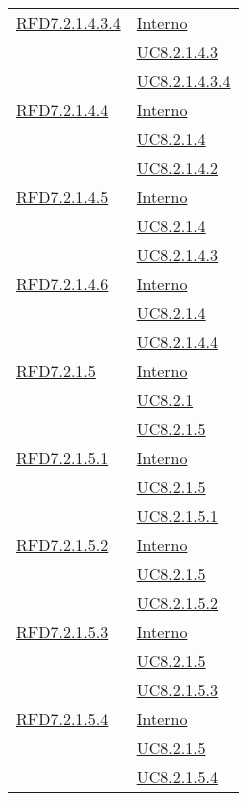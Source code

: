 \begin{longtable}{|>{\centering}m{5cm}|m{5cm}<{\centering}|}
\hyperlink{RFD7.2.1.4.3.4}{RFD7.2.1.4.3.4} & \hyperlink{Interno}{Interno}\\
& \hyperref[UC8.2.1.4.3]{UC8.2.1.4.3}\\
& \hyperref[UC8.2.1.4.3.4]{UC8.2.1.4.3.4}\\ \hline

\hyperlink{RFD7.2.1.4.4}{RFD7.2.1.4.4} & \hyperlink{Interno}{Interno}\\
& \hyperref[UC8.2.1.4]{UC8.2.1.4}\\
& \hyperref[UC8.2.1.4.2]{UC8.2.1.4.2}\\ \hline

\hyperlink{RFD7.2.1.4.5}{RFD7.2.1.4.5} & \hyperlink{Interno}{Interno}\\
& \hyperref[UC8.2.1.4]{UC8.2.1.4}\\
& \hyperref[UC8.2.1.4.3]{UC8.2.1.4.3}\\ \hline

\hyperlink{RFD7.2.1.4.6}{RFD7.2.1.4.6} & \hyperlink{Interno}{Interno}\\
& \hyperref[UC8.2.1.4]{UC8.2.1.4}\\
& \hyperref[UC8.2.1.4.4]{UC8.2.1.4.4}\\ \hline

\hyperlink{RFD7.2.1.5}{RFD7.2.1.5} & \hyperlink{Interno}{Interno}\\
& \hyperref[UC8.2.1]{UC8.2.1}\\
& \hyperref[UC8.2.1.5]{UC8.2.1.5}\\ \hline

\hyperlink{RFD7.2.1.5.1}{RFD7.2.1.5.1} & \hyperlink{Interno}{Interno}\\
& \hyperref[UC8.2.1.5]{UC8.2.1.5}\\
& \hyperref[UC8.2.1.5.1]{UC8.2.1.5.1}\\ \hline

\hyperlink{RFD7.2.1.5.2}{RFD7.2.1.5.2} & \hyperlink{Interno}{Interno}\\
& \hyperref[UC8.2.1.5]{UC8.2.1.5}\\
& \hyperref[UC8.2.1.5.2]{UC8.2.1.5.2}\\ \hline

\hyperlink{RFD7.2.1.5.3}{RFD7.2.1.5.3} & \hyperlink{Interno}{Interno}\\
& \hyperref[UC8.2.1.5]{UC8.2.1.5}\\
& \hyperref[UC8.2.1.5.3]{UC8.2.1.5.3}\\ \hline

\hyperlink{RFD7.2.1.5.4}{RFD7.2.1.5.4} & \hyperlink{Interno}{Interno}\\
& \hyperref[UC8.2.1.5]{UC8.2.1.5}\\
& \hyperref[UC8.2.1.5.4]{UC8.2.1.5.4}\\ \hline


\end{longtable}
